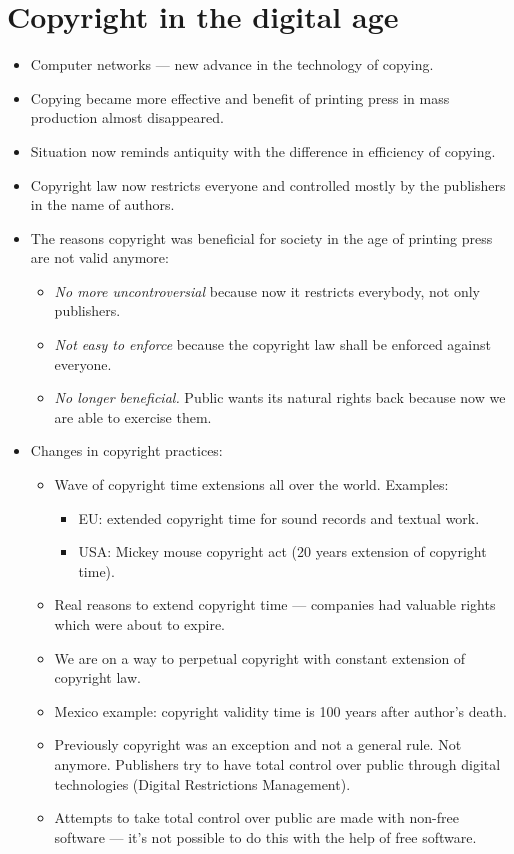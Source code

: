 \documentclass[twoside,openright]{report}
\begin{document}
\section{Copyright in the digital age }
\begin{itemize}
 \item    Computer networks --- new advance in the technology of copying.
 \item    Copying became more effective and benefit of printing press in mass production almost disappeared.
 \item    Situation now reminds antiquity with the difference in efficiency of copying.
 \item    Copyright law now restricts everyone and controlled mostly by the publishers in the name of authors.
 \item    The reasons copyright was beneficial for society in the age of printing press are not valid anymore:
\begin{itemize}
 \item        \emph{No more uncontroversial} because now it restricts everybody, not only publishers.
 \item        \emph{Not easy to enforce} because the copyright law shall be enforced against everyone.
 \item        \emph{No longer beneficial.} Public wants its natural rights back because now we are able to exercise them.
\end{itemize}
 \item    Changes in copyright practices:
\begin{itemize}
 \item        Wave of copyright time extensions all over the world. Examples:
\begin{itemize}
 \item            EU: extended copyright time for sound records and textual work.
 \item            USA: Mickey mouse copyright act (20 years extension of copyright time).
\end{itemize}
 \item        Real reasons to extend copyright time --- companies had valuable rights which were about to expire.
 \item        We are on a way to perpetual copyright with constant extension of copyright law.
 \item        Mexico example: copyright validity time is 100 years after author's death.
 \item        Previously copyright was an exception and not a general rule. Not anymore. Publishers try to have total control over public through digital technologies (Digital Restrictions Management).
 \item        Attempts to take total control over public are made with non-free software --- it's not possible to do this with the help of free software.
\end{itemize}
\end{itemize}
\end{document}
